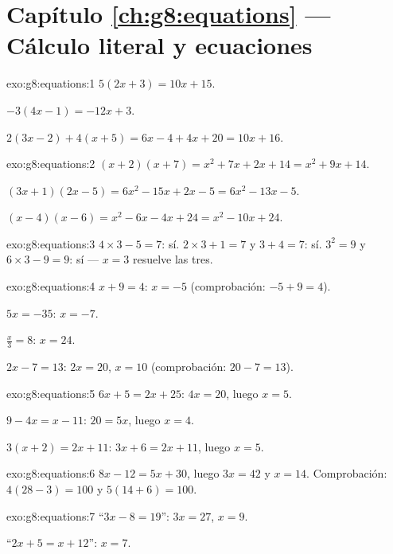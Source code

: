 \section*{Capítulo \ref{ch:g8:equations} --- Cálculo literal y ecuaciones}

\begin{solution}{exo:g8:equations:1}
$5(2x + 3) = 10x + 15$.

$-3(4x - 1) = -12x + 3$.

$2(3x - 2) + 4(x + 5) = 6x - 4 + 4x + 20 = 10x + 16$.
\end{solution}

\begin{solution}{exo:g8:equations:2}
$(x+2)(x+7) = x^2 + 7x + 2x + 14 = x^2 + 9x + 14$.

$(3x+1)(2x-5) = 6x^2 - 15x + 2x - 5 = 6x^2 - 13x - 5$.

$(x-4)(x-6) = x^2 - 6x - 4x + 24 = x^2 - 10x + 24$.
\end{solution}

\begin{solution}{exo:g8:equations:3}
$4 \times 3 - 5 = 7$: sí. \quad
$2 \times 3 + 1 = 7$ y $3 + 4 = 7$: sí. \quad
$3^2 = 9$ y $6 \times 3 - 9 = 9$: sí --- $x = 3$ resuelve las
tres.
\end{solution}

\begin{solution}{exo:g8:equations:4}
$x + 9 = 4$: $x = -5$ (comprobación: $-5 + 9 = 4$).

$5x = -35$: $x = -7$.

$\frac x3 = 8$: $x = 24$.

$2x - 7 = 13$: $2x = 20$, $x = 10$ (comprobación: $20 - 7 = 13$).
\end{solution}

\begin{solution}{exo:g8:equations:5}
$6x + 5 = 2x + 25$: $4x = 20$, luego $x = 5$.

$9 - 4x = x - 11$: $20 = 5x$, luego $x = 4$.

$3(x + 2) = 2x + 11$: $3x + 6 = 2x + 11$, luego $x = 5$.
\end{solution}

\begin{solution}{exo:g8:equations:6}
$8x - 12 = 5x + 30$, luego $3x = 42$ y $x = 14$. Comprobación:
$4(28 - 3) = 100$ y $5(14 + 6) = 100$.
\end{solution}

\begin{solution}{exo:g8:equations:7}
``$3x - 8 = 19$'': $3x = 27$, $x = 9$.

``$2x + 5 = x + 12$'': $x = 7$.
\end{solution}

